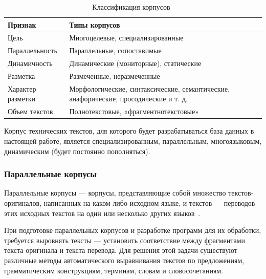 \begin{table}[H]
    \centering
    \begin{tabular}{|p{5cm}|p{11cm}|}
        \hline
        \textbf{Признак} & \textbf{Типы корпусов} \\ \hline
        Цель & Многоцелевые, специализированные \\ \hline
        Параллельность & Параллельные, сопоставимые \\ \hline
        Динамичность & Динамические (мониторные), статические \\ \hline
        Разметка & Размеченные, неразмеченные \\ \hline
        Характер разметки & Морфологические, синтаксические, семантические, анафорические, просодические и т. д. \\ \hline
        Объем текстов & Полнотекстовые, «фрагментнотекстовые» \\ \hline
    \end{tabular}
    \caption{Классификация корпусов~\cite[с. 57]{cl2020}}
    \label{tab:cc}
\end{table}

Корпус технических текстов, для которого будет разрабатываться база данных в настоящей работе, является специализированным, параллельным, многоязыковым, динамическим (будет постоянно пополняться).

\subsubsection*{Параллельные корпусы}

Параллельные корпусы --- корпусы, представляющие собой множество текстов-оригиналов, написанных на каком-либо исходном языке, и текстов --- переводов этих исходных текстов на один или несколько других языков~\cite[с. 61]{cl2020}.

При подготовке параллельных корпусов и разработке программ для их обработки, требуется выровнять тексты --- установить соответствие между фрагментами текста оригинала и текста перевода.
Для решения этой задачи существуют различные методы автоматического выравнивания текстов по предложениям, грамматическим конструкциям, терминам, словам и словосочетаниям.~\cite[с. 61]{cl2020}


